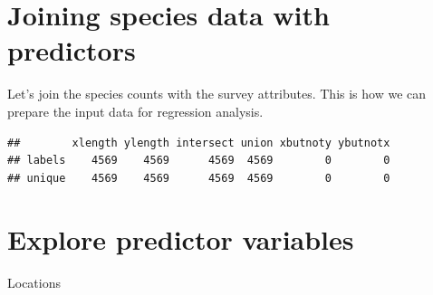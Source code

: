 \documentclass[12pt,]{book}
\newenvironment{Shaded}{\begin{snugshade}}{\end{snugshade}}
\newcommand{\CommentTok}[1]{\textcolor[rgb]{0.56,0.35,0.01}{\textit{#1}}}
\newcommand{\KeywordTok}[1]{\textcolor[rgb]{0.13,0.29,0.53}{\textbf{#1}}}
\newcommand{\NormalTok}[1]{#1}
\newcommand{\OperatorTok}[1]{\textcolor[rgb]{0.81,0.36,0.00}{\textbf{#1}}}
\newcommand{\StringTok}[1]{\textcolor[rgb]{0.31,0.60,0.02}{#1}}
\begin{document}
\hypertarget{joining-species-data-with-predictors}{%
\section{Joining species data with predictors}\label{joining-species-data-with-predictors}}

Let's join the species counts with the survey attributes. This is how we can prepare the
input data for regression analysis.

\begin{Shaded}
\end{Shaded}

\begin{verbatim}
##        xlength ylength intersect union xbutnoty ybutnotx
## labels    4569    4569      4569  4569        0        0
## unique    4569    4569      4569  4569        0        0
\end{verbatim}

\begin{Shaded}
\end{Shaded}

\hypertarget{explore-predictor-variables}{%
\section{Explore predictor variables}\label{explore-predictor-variables}}

Locations
\end{document}
